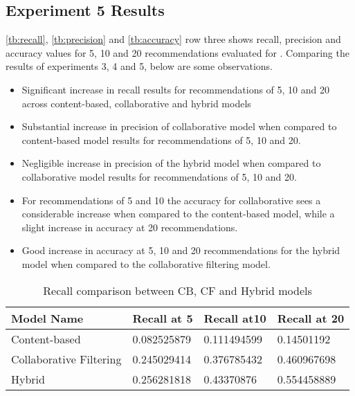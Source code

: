 \subsection{Experiment 5 Results}
\autoref{tb:recall}, \autoref{tb:precision} and \autoref{tb:accuracy} row three shows recall, precision and accuracy values for 5, 10 and 20 recommendations evaluated for . Comparing the results of experiments 3, 4 and 5, below are some observations.
\begin{itemize}
\item Significant increase in recall results for recommendations of 5, 10 and 20 across content-based, collaborative and hybrid models
\item Substantial increase in precision of collaborative model when compared to content-based model results for recommendations of 5, 10 and 20.
\item Negligible increase in precision of the hybrid model when compared to collaborative model results for recommendations of 5, 10 and 20.
\item For recommendations of 5 and 10 the accuracy for collaborative sees a considerable increase when compared to the content-based model, while a slight increase in accuracy at 20 recommendations.
\item Good increase in accuracy at 5, 10 and 20 recommendations for the hybrid model when compared to the collaborative filtering model.
\end{itemize}

\begin{table}[H]
\centering
\begin{tabular}{|l|l|l|l|}
\hline
\rowcolor[HTML]{C0C0C0} 
{\color[HTML]{000000} \textbf{Model Name}}     & {\color[HTML]{000000} \textbf{Recall at 5}} & {\color[HTML]{000000} \textbf{Recall at10}} & {\color[HTML]{000000} \textbf{Recall at 20}} \\ \hline
{\color[HTML]{000000} Content-based}           & {\color[HTML]{000000} 0.082525879}          & {\color[HTML]{000000} 0.111494599}          & {\color[HTML]{000000} 0.14501192}            \\ \hline
{\color[HTML]{000000} Collaborative Filtering} & {\color[HTML]{000000} 0.245029414}          & {\color[HTML]{000000} 0.376785432}          & {\color[HTML]{000000} 0.460967698}           \\ \hline
{\color[HTML]{000000} Hybrid}                  & {\color[HTML]{000000} 0.256281818}          & {\color[HTML]{000000} 0.43370876}           & {\color[HTML]{000000} 0.554458889}           \\ \hline
\end{tabular}
\caption{Recall comparison between CB, CF and Hybrid models}
\label{tb:recall}
\end{table}

